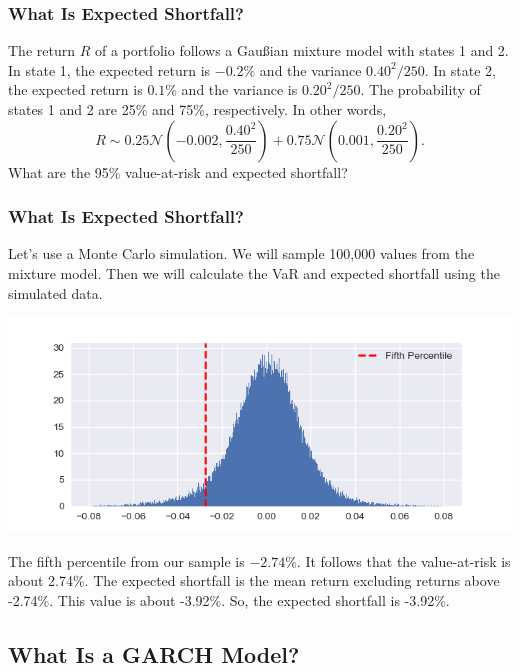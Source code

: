 \documentclass{beamer}
\begin{document}
\begin{frame}
\frametitle{What Is Expected Shortfall?}
\begin{example}
The return $R$ of a portfolio follows a Gau{\ss}ian mixture model with states 1 and 2. In state 1, the expected return is $-0.2\%$  and the variance $0.40^2/250$. In state 2, the expected  return is $0.1\%$ and the variance is $0.20^2/250$. The probability of states 1 and 2 are 25\% and 75\%, respectively. In other words,
$$
R\sim{0.25\mathcal{N}\left(-0.002, \frac{0.40^2}{250}\right) + 0.75\mathcal{N}\left(0.001, \frac{0.20^2}{250}\right)}. 
$$
What are the 95\% value-at-risk and expected shortfall?
\end{example}
\end{frame}

\begin{frame}
\frametitle{What Is Expected Shortfall?}
\begin{solution}
Let's use a Monte Carlo simulation. We will sample 100,000 values from the mixture model. Then we will calculate the VaR and expected shortfall using the simulated data.
\begin{center}
\includegraphics[scale = 0.4]{mix_norm.png}
\end{center}
The fifth percentile from our sample is $-2.74\%$. It follows that the value-at-risk is about 2.74\%. The expected shortfall is the mean return excluding returns above -2.74\%. This value is about -3.92\%. So, the expected shortfall is -3.92\%.
\end{solution}
\end{frame}

\subsection{What Is a GARCH Model?}
\end{document}
